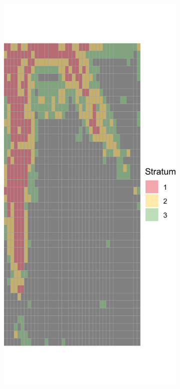 \documentclass[a4paper,12pt]{article}
\begin{document}
\begin{figure}[H]
	\begin{subfigure}[b]{0.3\textwidth}
	  \centering
	  \includegraphics[width=\textwidth]{../outputs/grid_output/strata_viz/makenzijeva_strata.png}

\end{subfigure}
\end{figure}
\end{document}
